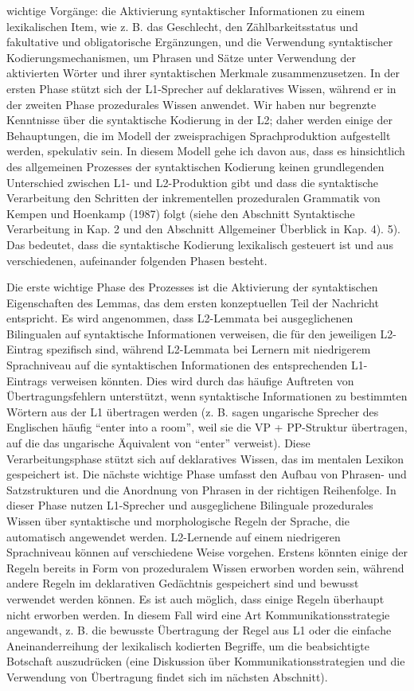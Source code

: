 \documentclass[
  letterpaper,
]{scrbook}
\begin{document}
wichtige Vorgänge: die Aktivierung syntaktischer Informationen zu einem
lexikalischen Item, wie z. B. das Geschlecht, den Zählbarkeitsstatus und
fakultative und obligatorische Ergänzungen, und die Verwendung
syntaktischer Kodierungsmechanismen, um Phrasen und Sätze unter
Verwendung der aktivierten Wörter und ihrer syntaktischen Merkmale
zusammenzusetzen. In der ersten Phase stützt sich der L1-Sprecher auf
deklaratives Wissen, während er in der zweiten Phase prozedurales Wissen
anwendet. Wir haben nur begrenzte Kenntnisse über die syntaktische
Kodierung in der L2; daher werden einige der Behauptungen, die im Modell
der zweisprachigen Sprachproduktion aufgestellt werden, spekulativ sein.
In diesem Modell gehe ich davon aus, dass es hinsichtlich des
allgemeinen Prozesses der syntaktischen Kodierung keinen grundlegenden
Unterschied zwischen L1- und L2-Produktion gibt und dass die
syntaktische Verarbeitung den Schritten der inkrementellen prozeduralen
Grammatik von Kempen und Hoenkamp (1987) folgt (siehe den Abschnitt
Syntaktische Verarbeitung in Kap. 2 und den Abschnitt Allgemeiner
Überblick in Kap. 4). 5). Das bedeutet, dass die syntaktische Kodierung
lexikalisch gesteuert ist und aus verschiedenen, aufeinander folgenden
Phasen besteht.

Die erste wichtige Phase des Prozesses ist die Aktivierung der
syntaktischen Eigenschaften des Lemmas, das dem ersten konzeptuellen
Teil der Nachricht entspricht. Es wird angenommen, dass L2-Lemmata bei
ausgeglichenen Bilingualen auf syntaktische Informationen verweisen, die
für den jeweiligen L2-Eintrag spezifisch sind, während L2-Lemmata bei
Lernern mit niedrigerem Sprachniveau auf die syntaktischen Informationen
des entsprechenden L1-Eintrags verweisen könnten. Dies wird durch das
häufige Auftreten von Übertragungsfehlern unterstützt, wenn syntaktische
Informationen zu bestimmten Wörtern aus der L1 übertragen werden (z. B.
sagen ungarische Sprecher des Englischen häufig ``enter into a room'',
weil sie die VP + PP-Struktur übertragen, auf die das ungarische
Äquivalent von ``enter'' verweist). Diese Verarbeitungsphase stützt sich
auf deklaratives Wissen, das im mentalen Lexikon gespeichert ist. Die
nächste wichtige Phase umfasst den Aufbau von Phrasen- und
Satzstrukturen und die Anordnung von Phrasen in der richtigen
Reihenfolge. In dieser Phase nutzen L1-Sprecher und ausgeglichene
Bilinguale prozedurales Wissen über syntaktische und morphologische
Regeln der Sprache, die automatisch angewendet werden. L2-Lernende auf
einem niedrigeren Sprachniveau können auf verschiedene Weise vorgehen.
Erstens könnten einige der Regeln bereits in Form von prozeduralem
Wissen erworben worden sein, während andere Regeln im deklarativen
Gedächtnis gespeichert sind und bewusst verwendet werden können. Es ist
auch möglich, dass einige Regeln überhaupt nicht erworben werden. In
diesem Fall wird eine Art Kommunikationsstrategie angewandt, z. B. die
bewusste Übertragung der Regel aus L1 oder die einfache
Aneinanderreihung der lexikalisch kodierten Begriffe, um die
beabsichtigte Botschaft auszudrücken (eine Diskussion über
Kommunikationsstrategien und die Verwendung von Übertragung findet sich
im nächsten Abschnitt).
\end{document}
